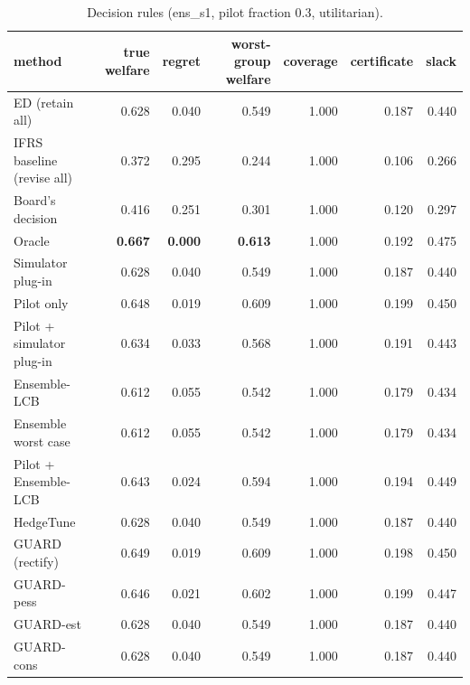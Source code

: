 \begin{table}[t]
\centering
\small
\begin{tabular}{lrrrrrr}
\toprule
method & true welfare & regret & worst-group welfare & coverage & certificate & slack \\
\midrule
ED (retain all) & 0.628 & 0.040 & 0.549 & 1.000 & 0.187 & 0.440 \\
IFRS baseline (revise all) & 0.372 & 0.295 & 0.244 & 1.000 & 0.106 & 0.266 \\
Board's decision & 0.416 & 0.251 & 0.301 & 1.000 & 0.120 & 0.297 \\
Oracle & \textbf{0.667} & \textbf{0.000} & \textbf{0.613} & 1.000 & 0.192 & 0.475 \\
Simulator plug-in & 0.628 & 0.040 & 0.549 & 1.000 & 0.187 & 0.440 \\
Pilot only & 0.648 & 0.019 & 0.609 & 1.000 & 0.199 & 0.450 \\
Pilot + simulator plug-in & 0.634 & 0.033 & 0.568 & 1.000 & 0.191 & 0.443 \\
Ensemble-LCB & 0.612 & 0.055 & 0.542 & 1.000 & 0.179 & 0.434 \\
Ensemble worst case & 0.612 & 0.055 & 0.542 & 1.000 & 0.179 & 0.434 \\
Pilot + Ensemble-LCB & 0.643 & 0.024 & 0.594 & 1.000 & 0.194 & 0.449 \\
HedgeTune & 0.628 & 0.040 & 0.549 & 1.000 & 0.187 & 0.440 \\
GUARD (rectify) & 0.649 & 0.019 & 0.609 & 1.000 & 0.198 & 0.450 \\
GUARD-pess & 0.646 & 0.021 & 0.602 & 1.000 & 0.199 & 0.447 \\
GUARD-est & 0.628 & 0.040 & 0.549 & 1.000 & 0.187 & 0.440 \\
GUARD-cons & 0.628 & 0.040 & 0.549 & 1.000 & 0.187 & 0.440 \\
\bottomrule
\end{tabular}
\caption{Decision rules (ens\_s1, pilot fraction 0.3, utilitarian).}
\label{tab:methods-utilitarian}
\end{table}
